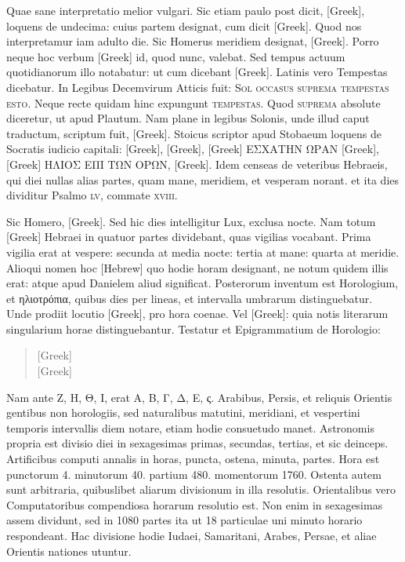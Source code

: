 Quae sane interpretatio melior vulgari.
Sic etiam paulo post dicit,
\textgreek{[Greek]}, loquens de undecima: cuius partem designat,
 cum dicit
\textgreek{[Greek]}.
Quod nos interpretamur iam adulto die.
Sic Homerus
meridiem designat, \textgreek{[Greek]}.
Porro neque
hoc verbum \textgreek{[Greek]} id, quod nunc, valebat.
Sed tempus actuum quotidianorum
illo notabatur: ut cum dicebant \textgreek{[Greek]}.
Latinis
vero Tempestas dicebatur.
In Legibus Decemvirum Atticis fuit:
\textsc{Sol occasus suprema tempestas esto}.
Neque recte
quidam hinc expungunt \textsc{tempestas}.
Quod \textsc{suprema} absolute
diceretur, ut apud Plautum.
Nam plane in legibus Solonis, unde illud
caput traductum, scriptum fuit,
 \textgreek{[Greek]}.
Stoicus
scriptor apud Stobaeum loquens de Socratis iudicio capitali: 
\textgreek{[Greek], [Greek], [Greek]
ΕΣΧΑΤΗΝ ΩΡΑΝ [Greek], [Greek] ΗΛΙΟΣ ΕΠΙ ΤΩΝ
ΟΡΩΝ, [Greek]}.
Idem censeas de veteribus Hebraeis,
qui diei nullas alias partes, quam mane, meridiem, et vesperam norant.
et ita dies dividitur Psalmo \textsc{lv}, commate \textsc{xviii}.

Sic Homero,
\textgreek{[Greek]}.
Sed hic dies intelligitur Lux, exclusa nocte.
Nam totum \textgreek{[Greek]} Hebraei in quatuor partes
 dividebant, quas vigilias
vocabant.
Prima vigilia erat at vespere: secunda at media nocte:
tertia at mane: quarta at meridie.
Alioqui nomen hoc \texthebrew{[Hebrew]} quo hodie
horam designant, ne notum quidem illis erat: atque apud Danielem
aliud significat.
Posterorum inventum est Horologium, et \textgreek{ηλιοτρόπια},
quibus dies per lineas, et intervalla umbrarum distinguebatur.
Unde prodiit locutio \textgreek{[Greek]}, pro hora coenae.
Vel \textgreek{[Greek]}:
quia notis literarum singularium horae distinguebantur.
Testatur et Epigrammatium de Horologio:
\begin{quote}
\textgreek{[Greek]}\\
\textgreek{[Greek]}
\end{quote}
Nam ante
\textgreek{Ζ, Η, Θ, Ι,} erat \textgreek{Α, Β, Γ, Δ, Ε, ς.}
Arabibus, Persis, et reliquis Orientis
gentibus non horologiis, sed
naturalibus matutini, meridiani,
et vespertini temporis
intervallis diem notare,
etiam hodie consuetudo manet.
Astronomis propria
est divisio diei in sexagesimas
primas, secundas, tertias,
et sic deinceps.
Artificibus
computi annalis in
horas, puncta, ostena, minuta,
partes.
Hora est punctorum
4. minutorum 40.
partium 480. momentorum
1760.
Ostenta autem sunt arbitraria,
quibuslibet aliarum
divisionum in illa resolutis.
Orientalibus vero Computatoribus
compendiosa horarum
resolutio est.
Non
enim in sexagesimas assem
dividunt, sed in 1080 partes
ita ut 18 particulae uni minuto
horario respondeant.
Hac divisione hodie Iudaei,
Samaritani, Arabes, Persae,
et aliae Orientis nationes utuntur.

